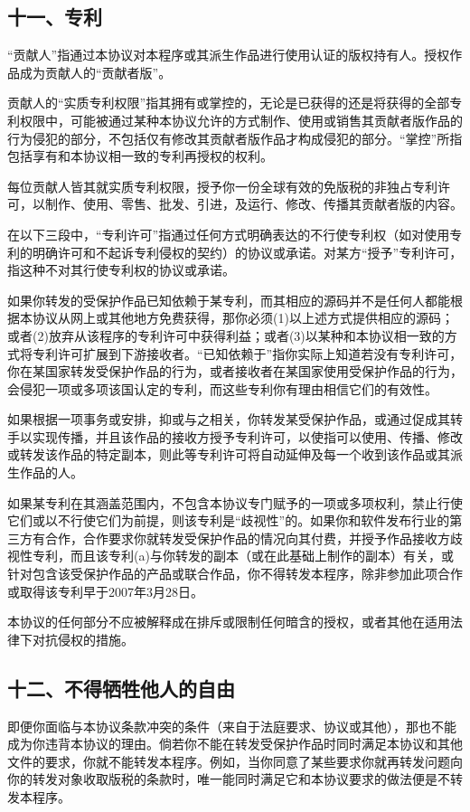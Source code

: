 \subsection{十一、专利}
“贡献人”指通过本协议对本程序或其派生作品进行使用认证的版权持有人。授权作品成为贡献人的“贡献者版”。\par
贡献人的“实质专利权限”指其拥有或掌控的，无论是已获得的还是将获得的全部专利权限中，可能被通过某种本协议允许的方式制作、使用或销售其贡献者版作品的行为侵犯的部分，不包括仅有修改其贡献者版作品才构成侵犯的部分。“掌控”所指包括享有和本协议相一致的专利再授权的权利。\par
每位贡献人皆其就实质专利权限，授予你一份全球有效的免版税的非独占专利许可，以制作、使用、零售、批发、引进，及运行、修改、传播其贡献者版的内容。\par
在以下三段中，“专利许可”指通过任何方式明确表达的不行使专利权（如对使用专利的明确许可和不起诉专利侵权的契约）的协议或承诺。对某方“授予”专利许可，指这种不对其行使专利权的协议或承诺。\par
如果你转发的受保护作品已知依赖于某专利，而其相应的源码并不是任何人都能根据本协议从网上或其他地方免费获得，那你必须(1)以上述方式提供相应的源码；或者(2)放弃从该程序的专利许可中获得利益；或者(3)以某种和本协议相一致的方式将专利许可扩展到下游接收者。“已知依赖于”指你实际上知道若没有专利许可，你在某国家转发受保护作品的行为，或者接收者在某国家使用受保护作品的行为，会侵犯一项或多项该国认定的专利，而这些专利你有理由相信它们的有效性。\par
如果根据一项事务或安排，抑或与之相关，你转发某受保护作品，或通过促成其转手以实现传播，并且该作品的接收方授予专利许可，以使指可以使用、传播、修改或转发该作品的特定副本，则此等专利许可将自动延伸及每一个收到该作品或其派生作品的人。\par
如果某专利在其涵盖范围内，不包含本协议专门赋予的一项或多项权利，禁止行使它们或以不行使它们为前提，则该专利是“歧视性”的。如果你和软件发布行业的第三方有合作，合作要求你就转发受保护作品的情况向其付费，并授予作品接收方歧视性专利，而且该专利(a)与你转发的副本（或在此基础上制作的副本）有关，或针对包含该受保护作品的产品或联合作品，你不得转发本程序，除非参加此项合作或取得该专利早于2007年3月28日。\par
本协议的任何部分不应被解释成在排斥或限制任何暗含的授权，或者其他在适用法律下对抗侵权的措施。
\subsection{十二、不得牺牲他人的自由}
即便你面临与本协议条款冲突的条件（来自于法庭要求、协议或其他），那也不能成为你违背本协议的理由。倘若你不能在转发受保护作品时同时满足本协议和其他文件的要求，你就不能转发本程序。例如，当你同意了某些要求你就再转发问题向你的转发对象收取版税的条款时，唯一能同时满足它和本协议要求的做法便是不转发本程序。
